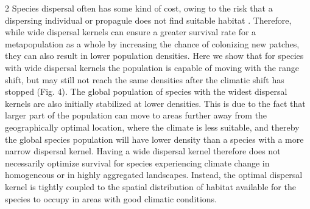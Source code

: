 \documentclass[12pt,pdftex]{article}
\begin{document}
\begin{spacing}{2}
Species dispersal often has some kind of cost, owing to the risk that a dispersing individual or propagule does not find suitable habitat \citep{Bonte2012}. Therefore, while wide dispersal kernels can ensure a greater survival rate for a metapopulation as a whole by increasing the chance of colonizing new patches, they can also result in lower population densities. Here we show that for species with wide dispersal kernels the population is capable of moving with the range shift, but may still not reach the same densities after the climatic shift has stopped (Fig. 4).  The global population of species with the widest dispersal kernels are also initially stabilized at lower densities. This is due to the fact that larger part of the population can move to areas further away from the geographically optimal location, where the climate is less suitable, and thereby the global species population will have lower density than a species with a more narrow dispersal kernel. Having a wide dispersal kernel therefore does not necessarily optimize survival for species experiencing climate change in homogeneous or in highly aggregated landscapes. Instead, the optimal dispersal kernel is tightly coupled to the spatial distribution of habitat available for the species to occupy in areas with good climatic conditions. 




\end{spacing}
\end{document}
